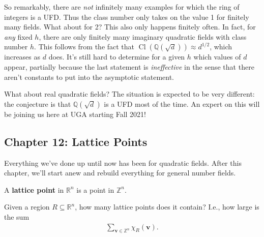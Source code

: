 \begin{remark}

So remarkably, there are \emph{not} infinitely many examples for which
the ring of integers is a UFD. Thus the class number only takes on the
value 1 for finitely many fields. What about for 2? This also only
happens finitely often. In fact, for \emph{any} fixed \(h\), there are
only finitely many imaginary quadratic fields with class number \(h\).
This follows from the fact that
\(\operatorname{Cl}({\mathbb{Q}}( \sqrt{d} )) \approx d^{1/2}\), which
increases as \(d\) does. It's still hard to determine for a given \(h\)
which values of \(d\) appear, partially because the last statement is
\emph{ineffective} in the sense that there aren't constants to put into
the asymptotic statement.

\end{remark}

\begin{remark}

What about real quadratic fields? The situation is expected to be very
different: the conjecture is that \({\mathbb{Q}}(\sqrt{d})\) is a UFD
most of the time. An expert on this will be joining us here at UGA
starting Fall 2021!

\end{remark}

\hypertarget{chapter-12-lattice-points}{%
\subsection{Chapter 12: Lattice
Points}\label{chapter-12-lattice-points}}

\begin{remark}

Everything we've done up until now has been for quadratic fields. After
this chapter, we'll start anew and rebuild everything for general number
fields.

\end{remark}

\begin{definition}

A \textbf{lattice point} in \({\mathbb{R}}^n\) is a point in
\({\mathbb{Z}}^n\).

\end{definition}

\begin{question}

Given a region \(R \subseteq {\mathbb{R}}^n\), how many lattice points
does it contain? I.e., how large is the sum
\begin{align*}
\sum_{\mathbf{v} \in {\mathbb{Z}}^n} \chi_R(\mathbf{v})
.\end{align*}

\end{question}

